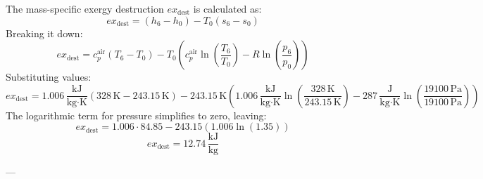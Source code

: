 The mass-specific exergy destruction \( ex_{\text{dest}} \) is calculated as:  
\[
ex_{\text{dest}} = (h_6 - h_0) - T_0 (s_6 - s_0)
\]  
Breaking it down:  
\[
ex_{\text{dest}} = c_p^{\text{air}} (T_6 - T_0) - T_0 \left( c_p^{\text{air}} \ln \left( \frac{T_6}{T_0} \right) - R \ln \left( \frac{p_6}{p_0} \right) \right)
\]  
Substituting values:  
\[
ex_{\text{dest}} = 1.006 \, \frac{\text{kJ}}{\text{kg·K}} (328 \, \text{K} - 243.15 \, \text{K}) - 243.15 \, \text{K} \left( 1.006 \, \frac{\text{kJ}}{\text{kg·K}} \ln \left( \frac{328 \, \text{K}}{243.15 \, \text{K}} \right) - 287 \, \frac{\text{J}}{\text{kg·K}} \ln \left( \frac{19100 \, \text{Pa}}{19100 \, \text{Pa}} \right) \right)
\]  
The logarithmic term for pressure simplifies to zero, leaving:  
\[
ex_{\text{dest}} = 1.006 \cdot 84.85 - 243.15 \left( 1.006 \ln(1.35) \right)
\]  
\[
ex_{\text{dest}} = 12.74 \, \frac{\text{kJ}}{\text{kg}}
\]  

---